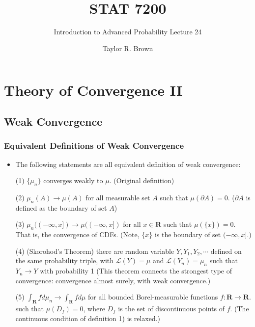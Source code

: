 \documentclass[handout]{beamer}
\title{STAT 7200}
\subtitle{Introduction to Advanced Probability \newline Lecture 24}
\author{Taylor R. Brown}
\institute{}
\date{}
\begin{document}
\frame{\titlepage}


\section[Outline]{}
\frame{\tableofcontents}


\section{Theory of Convergence II}
\subsection{Weak Convergence}



\frame
{
  \frametitle{Equivalent Definitions of Weak Convergence} 

   \begin{itemize}

               \item<1->[] \begin{Theorem} The following statements are all equivalent definition of weak convergence:

               (1) $\{\mu_n\}$ converges weakly to $\mu$. (Original definition) 
               \vspace{2mm}
               
                 {\color{blue} (2) $\mu_n(A)\rightarrow \mu(A)$ for all measurable set $A$ such that $\mu(\partial A)=0$. ($\partial A$ is defined as the boundary of set $A$) }
                              \vspace{2mm}

               (3) $\mu_n((-\infty, x])\rightarrow \mu((-\infty, x])$ for all $x\in \mathbf{R}$ such that $\mu(\{x\})=0$. That is, the convergence of CDFs. (Note, $\{x\}$ is the boundary of set $(-\infty, x]$.)
                              \vspace{2mm}

                 {\color{blue}  (4) (Skorohod's Theorem) there are random variable $Y, Y_1, Y_2, \cdots$ defined on the same probability triple, with $\mathcal{L} (Y)=\mu$ and $\mathcal{L} (Y_n)=\mu_n $ such that $Y_n\rightarrow Y$ with probability 1 (This theorem connects the strongest type of convergence: convergence almost surely, with weak convergence.) }
                              \vspace{2mm}

               (5) $\int_{\mathbf{R}}f d\mu_n \rightarrow \int_{\mathbf{R}}f d\mu$ for all bounded Borel-measurable functions $f:\mathbf{R}\rightarrow \mathbf{R}$. such that $\mu(D_f)=0$, where $D_f$ is the set of discontinuous points of $f$. (The continuous condition of definition 1) is relaxed.)
              
                            \end{Theorem}

                                               \end{itemize}
}
\end{document}
